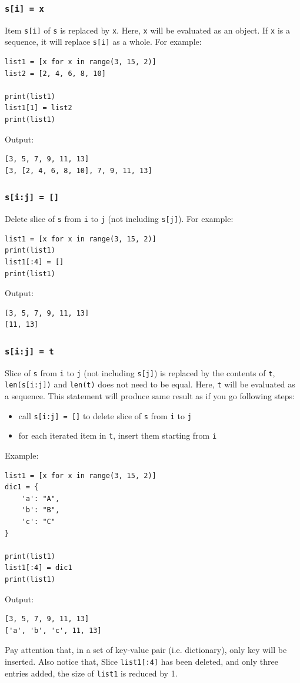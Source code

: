 \documentclass[12pt]{book}
\begin{document}
\subsubsection{\texttt{s[i] = x}}
\label{sec:org1751d0b}
Item \texttt{s[i]} of \texttt{s} is replaced by \texttt{x}. Here, \texttt{x} will be evaluated as an object. If \texttt{x} is a sequence, it will replace \texttt{s[i]} as a whole. For example:
\begin{verbatim}
list1 = [x for x in range(3, 15, 2)]
list2 = [2, 4, 6, 8, 10]

print(list1)
list1[1] = list2
print(list1)
\end{verbatim}
Output:
\begin{verbatim}
[3, 5, 7, 9, 11, 13]
[3, [2, 4, 6, 8, 10], 7, 9, 11, 13]
\end{verbatim}
\subsubsection{\texttt{s[i:j] = []}}
\label{sec:org8736515}
Delete slice of \texttt{s} from \texttt{i} to \texttt{j} (not including \texttt{s[j]}). For example:
\begin{verbatim}
list1 = [x for x in range(3, 15, 2)]
print(list1)
list1[:4] = []
print(list1)
\end{verbatim}
Output:
\begin{verbatim}
[3, 5, 7, 9, 11, 13]
[11, 13]
\end{verbatim}
\subsubsection{\texttt{s[i:j] = t}}
\label{sec:org3ab05c4}
Slice of \texttt{s} from \texttt{i} to \texttt{j} (not including \texttt{s[j]}) is replaced by the contents of \texttt{t}, \texttt{len(s[i:j])} and \texttt{len(t)} does not need to be equal. Here, \texttt{t} will be evaluated as a sequence. This statement will produce same result as if you go following steps:
\begin{itemize}
\item call \texttt{s[i:j] = []} to delete slice of \texttt{s} from \texttt{i} to \texttt{j}
\item for each iterated item in \texttt{t}, insert them starting from \texttt{i}
\end{itemize}

Example:
\begin{verbatim}
list1 = [x for x in range(3, 15, 2)]
dic1 = {
    'a': "A",
    'b': "B",
    'c': "C"
}

print(list1)
list1[:4] = dic1
print(list1)
\end{verbatim}
Output:
\begin{verbatim}
[3, 5, 7, 9, 11, 13]
['a', 'b', 'c', 11, 13]
\end{verbatim}
Pay attention that, in a set of key-value pair (i.e. dictionary), only key will be inserted. Also notice that, Slice \texttt{list1[:4]} has been deleted, and only three entries added, the size of \texttt{list1} is reduced by 1.
\end{document}
